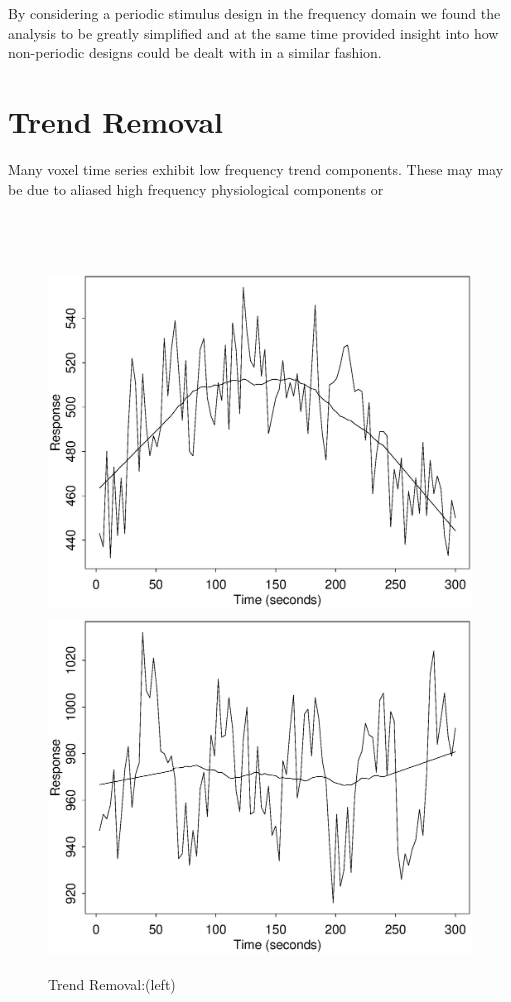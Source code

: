 \documentclass[a0,portrait]{a0poster}
\begin{document}
\begin{multicols}{3}
By considering a periodic stimulus design in the frequency
domain we found the analysis to be greatly simplified and at the same
time provided insight into how non-periodic designs could be dealt
with in a similar fashion.


\section{Trend Removal}
Many voxel time series exhibit low frequency trend components. These
may may be due to aliased high frequency physiological components or
\\
\\
\\
\\

\begin{figure}
\includegraphics[height=90mm,bb=25 169 579 595]{jm.fig3.eps}
\includegraphics[height=90mm,bb=25 169 579 595]{jm.fig2.eps}
  \caption{Trend Removal:(left) }
\label{trends}
\end{figure}



\end{multicols}
\end{document}
